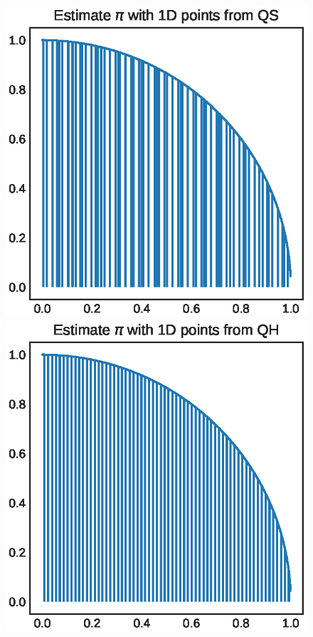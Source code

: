 \documentclass[shortabstract]{iithesis}
\begin{document}
\begin{figure}[!ht]
    \centering
    \includegraphics[scale=.6]{QS_1D_circle.eps}
    \includegraphics[scale=.6]{QH_1D_circle.eps}
    

\end{figure}
\end{document}
